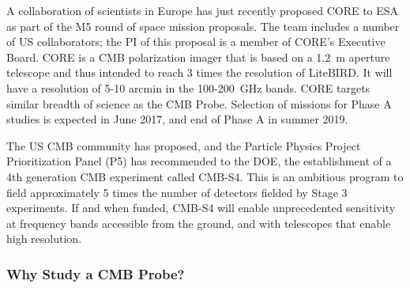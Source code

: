 
A collaboration of scientists in Europe has just recently proposed CORE to ESA as part of the M5 round 
of space mission proposals. 
The team includes a number of US collaborators; the PI of this proposal is a member of 
CORE's Executive Board. CORE is a CMB polarization imager that is based on a 
1.2~m aperture telescope and thus intended to reach 3 times the resolution of LiteBIRD. 
It will have a resolution of 5-10 arcmin in the 100-200~GHz bands. CORE targets similar 
breadth of science as the CMB Probe. 
Selection of missions for Phase A studies is expected in June 2017, and end of Phase A in summer 2019.

The US CMB community has proposed, and the Particle Physics Project Prioritization Panel (P5) has recommended 
to the DOE, the establishment of a 4th generation CMB experiment called CMB-S4. This is an ambitious 
program to field approximately 5 times the number of detectors fielded by Stage 3 experiments. If and when funded, 
CMB-S4 will enable unprecedented sensitivity at frequency bands accessible from the ground, and 
with telescopes that enable high resolution. 


\vspace{-0.18in}

\subsubsection{Why Study a CMB Probe?} 

\vspace{-0.05in}

